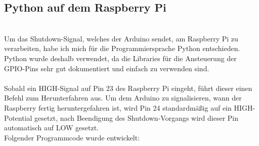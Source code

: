 \subsection{Python auf dem Raspberry Pi}\ \\
Um das Shutdown-Signal, welches der Arduino sendet, am Raspberry Pi zu verarbeiten, habe ich mich für die Programmiersprache Python entschieden. Python wurde deshalb verwendet, da die Libraries für die Ansteuerung der GPIO-Pins sehr gut dokumentiert und einfach zu verwenden sind.\\
\\
Sobald ein HIGH-Signal auf Pin 23 des Raspberry Pi eingeht, führt dieser einen Befehl zum Herunterfahren aus. Um dem Arduino zu signalisieren, wann der Raspberry fertig heruntergefahren ist, wird Pin 24 standardmäßig auf ein HIGH-Potential gesetzt, nach Beendigung des Shutdown-Vorgangs wird dieser Pin automatisch auf LOW gesetzt.
\\
Folgender Programmcode wurde entwickelt:

